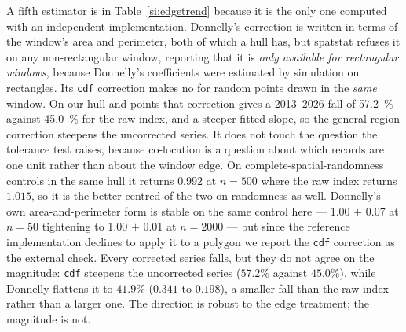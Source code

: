 \documentclass[fleqn,10pt]{wlpeerj}
\begin{document}
A fifth estimator is in Table~\ref{si:edgetrend} because it is the only one computed with an
independent implementation. Donnelly's correction \citep{donnelly1978simulations} is written in
terms of the window's area and
perimeter, both of which a hull has, but \textsf{spatstat} \citep{baddeley2005spatstat} refuses it
on any non-rectangular
window, reporting that it is \emph{only available for rectangular windows}, because Donnelly's
coefficients were estimated by simulation on rectangles. Its \texttt{cdf} correction makes no
for random points drawn in the \emph{same} window. On our hull and points that correction gives
a 2013--2026 fall of \SI{57.2}{\percent} against \SI{45.0}{\percent} for the raw index, and a
steeper fitted slope, so the general-region correction steepens the uncorrected series. It does
not touch the question the tolerance test raises, because co-location is a question about which
records are one unit rather than about the window edge. On complete-spatial-randomness controls in the same hull it returns $0.992$ at
$n = 500$ where the raw index returns $1.015$, so it is the better centred of the two on
randomness as well. Donnelly's own area-and-perimeter form is stable on the same control here
--- \num{1.00} $\pm$ \num{0.07} at $n = 50$ tightening to \num{1.00} $\pm$ \num{0.01} at
$n = 2000$ --- but since the reference implementation declines to apply it to a polygon we report
the \texttt{cdf} correction as the external check. Every corrected series falls, but they do not
agree on the magnitude: \texttt{cdf} steepens the uncorrected series ($57.2\%$ against $45.0\%$),
while Donnelly flattens it to $41.9\%$ ($0.341$ to $0.198$), a smaller fall than the raw index
rather than a larger one. The direction is robust to the edge treatment; the magnitude is not.
\end{document}
